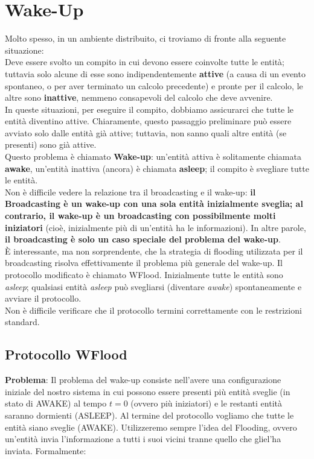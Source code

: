 \chapter{Wake-Up}

Molto spesso, in un ambiente distribuito, ci troviamo di fronte alla seguente
situazione:\\
Deve essere svolto un compito in cui devono essere coinvolte tutte le entità;
tuttavia solo alcune di esse sono indipendentemente \textbf{attive} (a causa di
un evento spontaneo, o per aver terminato un calcolo precedente) e pronte per il
calcolo, le altre sono \textbf{inattive}, nemmeno consapevoli del calcolo che
deve avvenire. \\
In queste situazioni, per eseguire il compito, dobbiamo assicurarci che tutte le
entità diventino attive. Chiaramente, questo passaggio preliminare può essere
avviato solo dalle entità già attive; tuttavia, non sanno quali altre entità (se
presenti) sono già attive.\\
Questo problema è chiamato \textbf{Wake-up}: un'entità attiva è solitamente
chiamata \textbf{awake}, un'entità inattiva (ancora) è chiamata \textbf{asleep};
il compito è svegliare tutte le entità.\\
Non è difficile vedere la relazione tra il broadcasting e il wake-up: \textbf{il
    Broadcasting è un wake-up con una sola entità inizialmente sveglia; al
    contrario, il wake-up è un broadcasting con possibilmente molti iniziatori}
(cioè, inizialmente più di un'entità ha le informazioni). In altre parole,
\textbf{il broadcasting è solo un caso speciale del problema del wake-up}.\\
È interessante, ma non sorprendente, che la strategia di flooding utilizzata per
il broadcasting risolva effettivamente il problema più generale del wake-up. Il
protocollo modificato è chiamato WFlood. Inizialmente tutte le entità sono
\textit{asleep}; qualsiasi entità \textit{asleep} può svegliarsi (diventare
\textit{awake}) spontaneamente e avviare il protocollo.\\
Non è difficile verificare che il protocollo termini correttamente con le
restrizioni standard. \vspace{1cm}\\

\section{Protocollo WFlood}
\textbf{Problema}: Il problema del wake-up consiste nell'avere una
configurazione iniziale del nostro sistema in cui possono essere presenti più
entità sveglie (in stato di AWAKE) al tempo $t=0$ (ovvero più iniziatori) e le
restanti entità saranno dormienti (ASLEEP). Al termine del protocollo vogliamo
che tutte le entità siano sveglie (AWAKE). Utilizzeremo sempre l'idea del
Flooding, ovvero un'entità invia l'informazione a tutti i suoi vicini tranne
quello che gliel'ha inviata. Formalmente:

